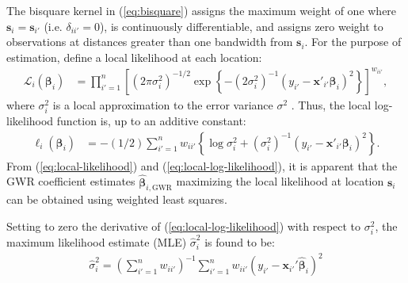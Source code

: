 \documentclass[authoryear, review, 11pt]{elsarticle}
\begin{document}
	The bisquare kernel in (\ref{eq:bisquare}) assigns the maximum weight of one where $\bm{s}_i = \bm{s}_{i'}$ (i.e. $\delta_{ii'}=0$), is continuously differentiable, and assigns zero weight to observations at distances greater than one bandwidth from $\bm{s}_i$. For the purpose of estimation, define a local likelihood at each location:
	\begin{align}\label{eq:local-likelihood}
		\mathcal{L}_i \left(\bm{\beta}_i \right) &= \prod_{i'=1}^n \left[ \left(2 \pi \sigma^2_i  \right)^{-1/2}  \exp\left\{-\left(2 \sigma^2_i\right)^{-1}  \left(y_{i'} - \bm{x}'_{i'} \bm{\beta}_i \right)^2 \right\} \right] ^ {w_{ii'}},
	\end{align}			
	where $\sigma_i^2$ is a local approximation to the error variance $\sigma^2$ \citep{Fotheringham:2002}. Thus, the local log-likelihood function is, up to an additive constant:
	\begin{align}\label{eq:local-log-likelihood}
		\ell_i\left(\bm{\beta}_i\right) &= -(1/2) \sum_{i'=1}^n w_{ii'} \left\{ \log{\sigma^2_i}  + \left(\sigma^2_i\right)^{-1}  \left(y_{i'} - \bm{x}'_{i'} \bm{\beta}_i \right)^2 \right\}.
	\end{align}
	From (\ref{eq:local-likelihood}) and (\ref{eq:local-log-likelihood}), it is apparent that the GWR coefficient estimates $\hat{\bm{\beta}}_{i,\text{GWR}}$ maximizing the local likelihood at location $\bm{s}_i$ can be obtained using weighted least squares. 
	
	 Setting to zero the derivative of (\ref{eq:local-log-likelihood}) with respect to $\sigma_i^2$, the maximum likelihood estimate (MLE) $\hat{\sigma}_i^2$ is found to be:	 
	 \begin{align}
	 	\hat{\sigma}_i^2 = \left(\sum \limits_{i'=1}^{n} w_{ii'} \right)^{-1} \sum \limits_{i'=1}^n w_{ii'}\left(y_{i'} - \bm{x}_{i'}'\hat{\bm{\beta}}_i\right)^2
	\end{align}
	
\end{document}
